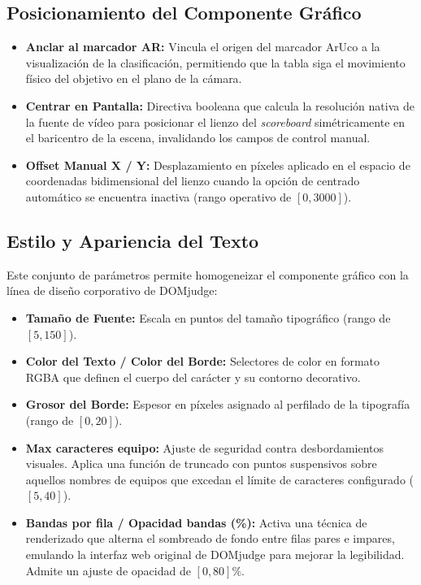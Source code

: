 \subsection{Posicionamiento del Componente Gráfico}
\begin{itemize}
    \item \textbf{Anclar al marcador AR:} Vincula el origen del marcador ArUco a la visualización de la clasificación, permitiendo que la tabla siga el movimiento físico del objetivo en el plano de la cámara.
    \item \textbf{Centrar en Pantalla:} Directiva booleana que calcula la resolución nativa de la fuente de vídeo para posicionar el lienzo del \textit{scoreboard} simétricamente en el baricentro de la escena, invalidando los campos de control manual.
    \item \textbf{Offset Manual X / Y:} Desplazamiento en píxeles aplicado en el espacio de coordenadas bidimensional del lienzo cuando la opción de centrado automático se encuentra inactiva (rango operativo de $[ 0, 3000 ]$).
\end{itemize}

\subsection{Estilo y Apariencia del Texto}
Este conjunto de parámetros permite homogeneizar el componente gráfico con la línea de diseño corporativo de DOMjudge:
\begin{itemize}
    \item \textbf{Tamaño de Fuente:} Escala en puntos del tamaño tipográfico (rango de $[ 5, 150 ]$).
    \item \textbf{Color del Texto / Color del Borde:} Selectores de color en formato RGBA que definen el cuerpo del carácter y su contorno decorativo.
    \item \textbf{Grosor del Borde:} Espesor en píxeles asignado al perfilado de la tipografía (rango de $[ 0, 20 ]$).
    \item \textbf{Max caracteres equipo:} Ajuste de seguridad contra desbordamientos visuales. Aplica una función de truncado con puntos suspensivos sobre aquellos nombres de equipos que excedan el límite de caracteres configurado ($[ 5, 40 ]$).
    \item \textbf{Bandas por fila / Opacidad bandas (\%):} Activa una técnica de renderizado que alterna el sombreado de fondo entre filas pares e impares, emulando la interfaz web original de DOMjudge para mejorar la legibilidad. Admite un ajuste de opacidad de $[ 0, 80 ]\%$.
\end{itemize}

